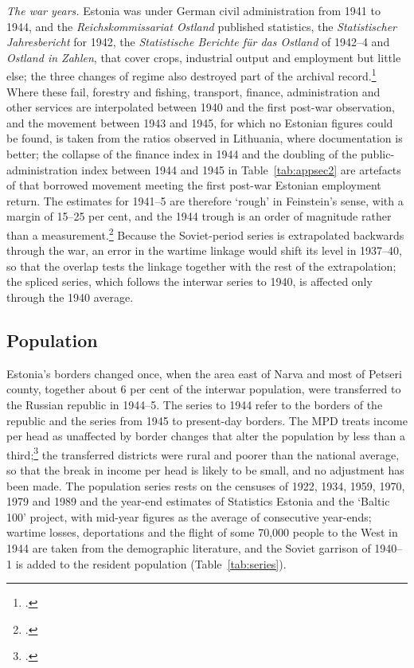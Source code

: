 \textit{The war years.} Estonia was under German civil administration from 1941 to 1944, and the \textit{Reichskommissariat Ostland} published statistics, the \textit{Statistischer Jahresbericht} for 1942, the \textit{Statistische Berichte f\"{u}r das Ostland} of 1942--4 and \textit{Ostland in Zahlen}, that cover crops, industrial output and employment but little else; the three changes of regime also destroyed part of the archival record.\footnote{\autocite[140]{dagys1959}.} Where these fail, forestry and fishing, transport, finance, administration and other services are interpolated between 1940 and the first post-war observation, and the movement between 1943 and 1945, for which no Estonian figures could be found, is taken from the ratios observed in Lithuania, where documentation is better; the collapse of the finance index in 1944 and the doubling of the public-administration index between 1944 and 1945 in Table~\ref{tab:appsec2} are artefacts of that borrowed movement meeting the first post-war Estonian employment return. The estimates for 1941--5 are therefore `rough' in Feinstein's sense, with a margin of 15--25 per cent, and the 1944 trough is an order of magnitude rather than a measurement.\footnote{\autocite[21]{feinstein1972}.} Because the Soviet-period series is extrapolated backwards through the war, an error in the wartime linkage would shift its level in 1937--40, so that the overlap tests the linkage together with the rest of the extrapolation; the spliced series, which follows the interwar series to 1940, is affected only through the 1940 average.

\subsection{Population}

Estonia's borders changed once, when the area east of Narva and most of Petseri county, together about 6 per cent of the interwar population, were transferred to the Russian republic in 1944--5. The series to 1944 refer to the borders of the republic and the series from 1945 to present-day borders. The MPD treats income per head as unaffected by border changes that alter the population by less than a third;\footnote{\autocite[629]{maddison_project_paper2014}.} the transferred districts were rural and poorer than the national average, so that the break in income per head is likely to be small, and no adjustment has been made. The population series rests on the censuses of 1922, 1934, 1959, 1970, 1979 and 1989 and the year-end estimates of Statistics Estonia and the `Baltic 100' project, with mid-year figures as the average of consecutive year-ends; wartime losses, deportations and the flight of some 70,000 people to the West in 1944 are taken from the demographic literature, and the Soviet garrison of 1940--1 is added to the resident population (Table~\ref{tab:series}).

